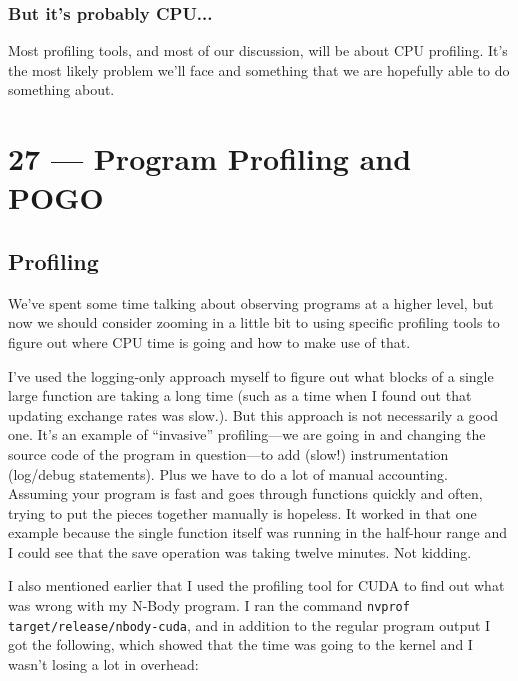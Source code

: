 \documentclass[a4paper]{report}
\begin{document}
\subsection*{But it's probably CPU...}
Most profiling tools, and most of our discussion, will be about CPU profiling. It's the most likely problem we'll face and something that we are hopefully able to do something about. 









\chapter*{27 --- Program Profiling and POGO}


\section*{Profiling}
We've spent some time talking about observing programs at a higher level, but now we should consider zooming in a little bit to using specific profiling tools to figure out where CPU time is going and how to make use of that.

I've used the logging-only approach myself to figure out what blocks of a single large function are taking a long time (such as a time when I found out that updating exchange rates was slow.). But this approach is not necessarily a good one.  It's an example of ``invasive'' profiling---we are going in and changing the source code of the program in question---to add (slow!) instrumentation (log/debug statements). Plus we have to do a lot of manual accounting. Assuming your program is fast and goes through functions quickly and often, trying to put the pieces together manually is hopeless. It worked in that one example because the single function itself was running in the half-hour range and I could see that the save operation was taking twelve minutes. Not kidding.

I also mentioned earlier that I used the profiling tool for CUDA to find out what was wrong with my N-Body program. I ran the command \texttt{nvprof target/release/nbody-cuda}, and in addition to the regular program output I got the following, which showed that the time was going to the kernel and I wasn't losing a lot in overhead:
\end{document}
